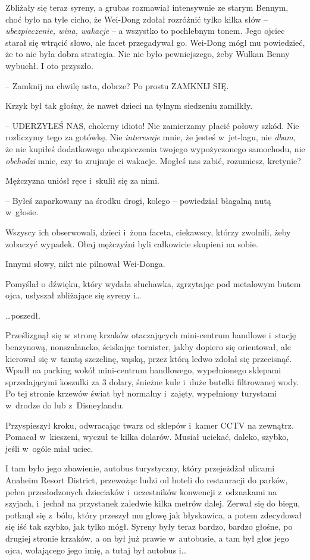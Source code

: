 \documentclass[oneside,polish,11pt,rmheadings]{mwbk}
\begin{document}
Zbliżały się teraz syreny, a grubas rozmawiał intensywnie ze starym Bennym, choć było na tyle cicho, że Wei-Dong zdołał rozróżnić tylko kilka słów -- \textit{ubezpieczenie, wina, wakacje }-- a wszystko to pochlebnym tonem. Jego ojciec starał się wtrącić słowo, ale facet przegadywał go. Wei-Dong mógł mu powiedzieć, że to nie była dobra strategia. Nic nie było pewniejszego, żeby Wulkan Benny wybuchł. I oto przyszło. 


-- Zamknij na chwilę usta, dobrze? Po prostu ZAMKNIJ SIĘ.  


Krzyk był tak głośny, że nawet dzieci na tylnym siedzeniu zamilkły. 


-- UDERZYŁEŚ NAS, cholerny idioto! Nie zamierzamy płacić połowy szkód. Nie rozliczymy tego za gotówkę. Nie \textit{interesuje} mnie, że jesteś w~jet-lagu, nie \textit{dbam, }że nie kupiłeś dodatkowego ubezpieczenia twojego wypożyczonego samochodu, nie \textit{obchodzi }mnie, czy to zrujnuje ci wakacje. Mogłeś nas zabić, rozumiesz, kretynie? 


Mężczyzna uniósł ręce i~skulił się za nimi. 

-- Byłeś zaparkowany na środku drogi, kolego -- powiedział błagalną nutą w~głosie. 


Wszyscy ich obserwowali, dzieci i~żona faceta, ciekawscy, którzy zwolnili, żeby zobaczyć wypadek. Obaj mężczyźni byli całkowicie skupieni na sobie. 


Innymi słowy, nikt nie pilnował Wei-Donga. 


Pomyślał o dźwięku, który wydała słuchawka, zgrzytając pod metalowym butem ojca, usłyszał zbliżające się syreny i\ldots  


\ldots poszedł. 


Prześlizgnął się w~stronę krzaków otaczających mini-centrum handlowe i~stację benzynową, nonszalancko, ściskając tornister, jakby dopiero się orientował, ale kierował się w~tamtą szczelinę, wąską, przez którą ledwo zdołał się przecisnąć. Wpadł na parking wokół mini-centrum handlowego, wypełnionego sklepami sprzedającymi koszulki za 3 dolary, śnieżne kule i~duże butelki filtrowanej wody. Po tej stronie krzewów świat był normalny i~zajęty, wypełniony turystami w~drodze do lub z~Disneylandu. 


Przyspieszył kroku, odwracając twarz od sklepów i~kamer CCTV na zewnątrz. Pomacał w~kieszeni, wyczuł te kilka dolarów. Musiał uciekać, daleko, szybko, jeśli w~ogóle miał uciec. 


I tam było jego zbawienie, autobus turystyczny, który przejeżdżał ulicami Anaheim Resort District, przewożąc ludzi od hoteli do restauracji do parków, pełen przesłodzonych dzieciaków i~uczestników konwencji z~odznakami na szyjach, i~jechał na przystanek zaledwie kilka metrów dalej. Zerwał się do biegu, potknął się z~bólu, który przeszył mu głowę jak błyskawica, a potem zdecydował się iść tak szybko, jak tylko mógł. Syreny były teraz bardzo, bardzo głośne, po drugiej stronie krzaków, a on był już prawie w~autobusie, a tam był głos jego ojca, wołającego jego imię, a tutaj był autobus i\ldots  
\end{document}
